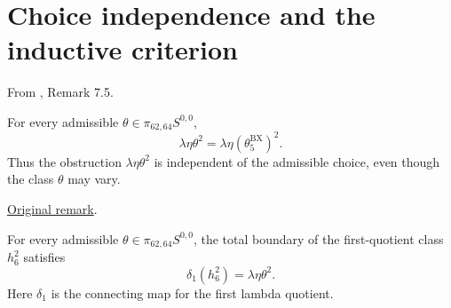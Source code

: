 \section{Choice independence and the inductive criterion}

\begin{remark}
\label{sem:Main:remark-7.5}
From \cite{LWX126}, Remark 7.5.\par
For every admissible $\theta\in\pi_{62,64}S^{0,0}$,
\[
 \lambda\eta\theta^2=\lambda\eta(\theta_5^{\mathrm{BX}})^2.
\]
Thus the obstruction $\lambda\eta\theta^2$ is independent of the
admissible choice, even though the class $\theta$ may vary.

\href{paper/main.tex.html#L2133}{Original remark}.

For every admissible $\theta\in\pi_{62,64}S^{0,0}$, the total boundary of the first-quotient class $h_6^2$ satisfies
\[
 \delta_1(h_6^2)=\lambda\eta\theta^2.
\]
Here $\delta_1$ is the connecting map for the first lambda quotient.
\end{remark}
